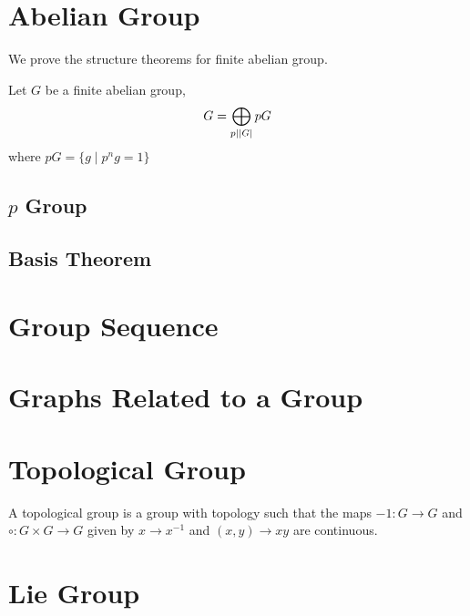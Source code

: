 \section{Abelian Group}
We prove the structure theorems for finite abelian group.

\begin{thm}
Let $G$ be a finite abelian group,
$$G = \bigoplus_{p \mid \left| {G} \right|} pG$$
where $pG = \{g \mid p^ng = 1\}$
\end{thm}

\subsection{$p$ Group}
\subsection{Basis Theorem}

\section{Group Sequence}
\section{Graphs Related to a Group}
\section{Topological Group}
A topological group is a group with topology such that the maps
$-1 : G \to G$ and $\circ : G \times G \to G$ given by
$x \to x^{-1}$ and $(x, y) \to xy$ are continuous.

\section{Lie Group}
